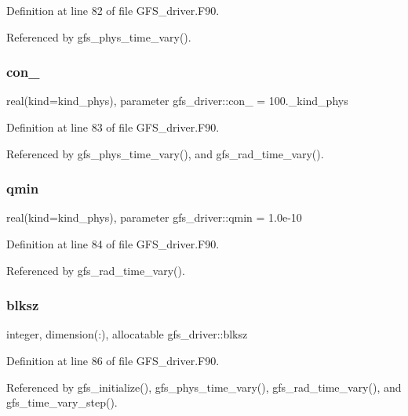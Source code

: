 Definition at line 82 of file G\+F\+S\+\_\+driver.\+F90.



Referenced by gfs\+\_\+phys\+\_\+time\+\_\+vary().

\mbox{\label{namespacegfs__driver_ac7e929b29814a67e0c2d8f59b7a8f7ef}} 
\subsubsection{con\+\_}
{\footnotesize\ttfamily real(kind=kind\+\_\+phys), parameter gfs\+\_\+driver\+::con\+\_ = 100.\+\_\+kind\+\_\+phys\hspace{0.3cm}{\ttfamily [private]}}



Definition at line 83 of file G\+F\+S\+\_\+driver.\+F90.



Referenced by gfs\+\_\+phys\+\_\+time\+\_\+vary(), and gfs\+\_\+rad\+\_\+time\+\_\+vary().

\mbox{\label{namespacegfs__driver_a1dc506e00472176743d287ee18bb19c1}} 
\subsubsection{qmin}
{\footnotesize\ttfamily real(kind=kind\+\_\+phys), parameter gfs\+\_\+driver\+::qmin = 1.\+0e-\/10\hspace{0.3cm}{\ttfamily [private]}}



Definition at line 84 of file G\+F\+S\+\_\+driver.\+F90.



Referenced by gfs\+\_\+rad\+\_\+time\+\_\+vary().

\mbox{\label{namespacegfs__driver_aa3cc44000d84c245dd953c17da5c0f4b}} 
\subsubsection{blksz}
{\footnotesize\ttfamily integer, dimension(\+:), allocatable gfs\+\_\+driver\+::blksz\hspace{0.3cm}{\ttfamily [private]}}



Definition at line 86 of file G\+F\+S\+\_\+driver.\+F90.



Referenced by gfs\+\_\+initialize(), gfs\+\_\+phys\+\_\+time\+\_\+vary(), gfs\+\_\+rad\+\_\+time\+\_\+vary(), and gfs\+\_\+time\+\_\+vary\+\_\+step().

